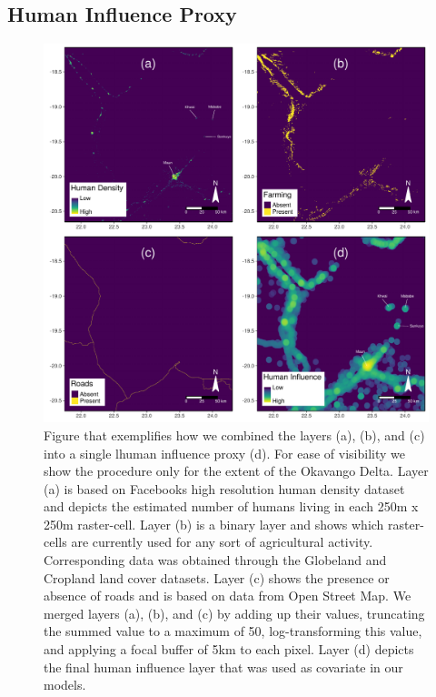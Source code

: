 \documentclass[abstract=on,10pt,a4paper,bibliography=totocnumbered]{scrartcl}
\begin{document}
\newpage
\subsection{Human Influence Proxy}
\label{Appendix:HumanInfluence}
\begin{figure}[h]
  \begin{center}
    \includegraphics[width = \textwidth]{99_HumanInfluence.pdf}
    \caption{Figure that exemplifies how we combined the layers (a), (b), and
    (c) into a single lhuman influence proxy (d). For ease of visibility we show
    the procedure only for the extent of the Okavango Delta. Layer (a) is based
    on Facebooks high resolution human density dataset and depicts the estimated
    number of humans living in each 250m x 250m raster-cell. Layer (b) is a
    binary layer and shows which raster-cells are currently used for any sort of
    agricultural activity. Corresponding data was obtained through the Globeland
    and Cropland land cover datasets. Layer (c) shows the presence or absence of
    roads and is based on data from Open Street Map. We merged layers (a), (b),
    and (c) by adding up their values, truncating the summed value to a maximum
    of 50, log-transforming this value, and applying a focal buffer of 5km to
    each pixel. Layer (d) depicts the final human influence layer that was used
    as covariate in our models.}
    \label{Trajectories}
  \end{center}
\end{figure}
\end{document}
